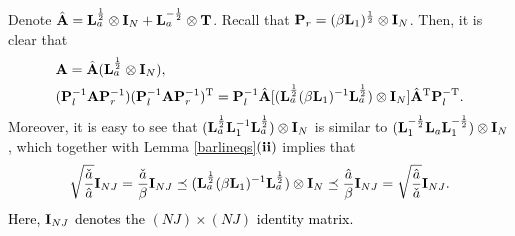 \documentclass[11pt]{article}%
\numberwithin{equation}{section}
\newenvironment{proof}{\noindent{\bf Proof:}}{\hfill\fbox{}\vspace*{1mm}}
\begin{document}
\begin{proof} 	
	Denote $\hat{\bf A}={\bf L}_a^{\frac{1}{2}}\otimes{\bf I}_N+{\bf L}_a^{-\frac{1}{2}}\otimes{\bf T}$. Recall that ${\bf P}_r=(\beta{\bf L}_{1})^{\frac{1}{2}}\otimes{\bf I}_N$. Then, it is clear that 
	\begin{align}
	&{\bf A}=\hat{\bf A}({\bf L}_a^{\frac{1}{2}}\otimes{\bf I}_N),\notag\\
	&({\bf P}_l^{-1}{\bf A}{\bf P}_r^{-1})({\bf P}_l^{-1}{\bf A}{\bf P}_r^{-1})^{\rm T}={\bf P}_l^{-1}\hat{\bf A}[({\bf L}_a^{\frac{1}{2}}(\beta{\bf L}_{1})^{-1}{\bf L}_a^{\frac{1}{2}})\otimes{\bf I}_N]\hat{\bf A}^{\rm T}{\bf P}_l^{-\rm T}.\notag
	\end{align}
	Moreover, it is easy to see that $({\bf L}_a^{\frac{1}{2}}{\bf L}_{1}^{-1}{\bf L}_a^{\frac{1}{2}})\otimes{\bf I}_N$ is similar to $({\bf L}_{1}^{-\frac{1}{2}}{\bf L}_a{\bf L}_{1}^{-\frac{1}{2}})\otimes{\bf I}_N$, which together with Lemma \ref{barlineqs}${\bf (ii)}$ implies that
	\begin{equation*}
	\sqrt{\frac{\check{a}}{\hat{a}}}{\bf I}_{NJ}=\frac{\check{a}}{\beta}{\bf I}_{NJ}\preceq({\bf L}_a^{\frac{1}{2}}(\beta{\bf L}_{1})^{-1}{\bf L}_a^{\frac{1}{2}})\otimes{\bf I}_N\preceq\frac{\hat{a}}{\beta}{\bf I}_{NJ}=\sqrt{\frac{\hat{a}}{\check{a}}}{\bf I}_{NJ}.
	\end{equation*}
    \textcolor{black}{ Here, ${\bf I}_{NJ}$ denotes the $(NJ)\times (NJ)$ identity matrix.}
	

\end{proof}
\end{document}
